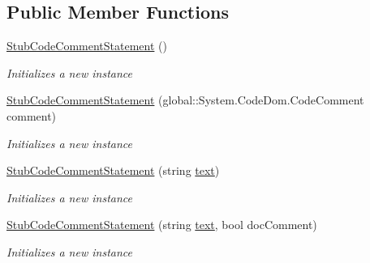 \subsection*{Public Member Functions}
\begin{DoxyCompactItemize}
\item 
\hyperlink{class_system_1_1_code_dom_1_1_fakes_1_1_stub_code_comment_statement_a900fa155fbdd56e2f1906841d1979d93}{Stub\-Code\-Comment\-Statement} ()
\begin{DoxyCompactList}\small\item\em Initializes a new instance\end{DoxyCompactList}\item 
\hyperlink{class_system_1_1_code_dom_1_1_fakes_1_1_stub_code_comment_statement_ab167cf35610b6815ac7786639332e8c6}{Stub\-Code\-Comment\-Statement} (global\-::\-System.\-Code\-Dom.\-Code\-Comment comment)
\begin{DoxyCompactList}\small\item\em Initializes a new instance\end{DoxyCompactList}\item 
\hyperlink{class_system_1_1_code_dom_1_1_fakes_1_1_stub_code_comment_statement_af276ee607ea1f6303201b95943878bc9}{Stub\-Code\-Comment\-Statement} (string \hyperlink{jquery-1_810_82-vsdoc_8js_aa5b77da29631a344064bb3d20c8702de}{text})
\begin{DoxyCompactList}\small\item\em Initializes a new instance\end{DoxyCompactList}\item 
\hyperlink{class_system_1_1_code_dom_1_1_fakes_1_1_stub_code_comment_statement_a2cb97bdc3701e4c768115d8121c5f899}{Stub\-Code\-Comment\-Statement} (string \hyperlink{jquery-1_810_82-vsdoc_8js_aa5b77da29631a344064bb3d20c8702de}{text}, bool doc\-Comment)
\begin{DoxyCompactList}\small\item\em Initializes a new instance\end{DoxyCompactList}\end{DoxyCompactItemize}
